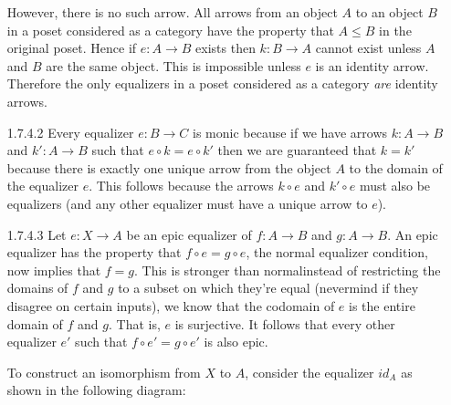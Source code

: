 \documentclass{article}
\begin{document}
\begin{enumerate}
\begin{center}
  \end{center}

  However, there is no such arrow.
  All arrows from an object $A$ to an object $B$ in a poset considered as a category have the property that $A \le B$ in the original poset.
  Hence if $e : A \rightarrow B$ exists then $k : B \rightarrow A$ cannot exist unless $A$ and $B$ are the same object.
  This is impossible unless $e$ is an identity arrow.
  Therefore the only equalizers in a poset considered as a category \emph{are} identity arrows.

\item[]
\item[1.7.4.2]
  Every equalizer $e : B \rightarrow C$ is monic because if we have arrows $k : A \rightarrow B$ and $k' : A \rightarrow B$ such that $e \circ k = e \circ k'$ then we are guaranteed that $k = k'$ because there is exactly one unique arrow from the object $A$ to the domain of the equalizer $e$.
  This follows because the arrows $k \circ e$ and $k' \circ e$ must also be equalizers (and any other equalizer must have a unique arrow to $e$).
  
\item[]
\item[1.7.4.3]
  Let $e : X \rightarrow A$ be an epic equalizer of $f : A \rightarrow B$ and $g : A \rightarrow B$.
  An epic equalizer has the property that $f \circ e = g \circ e$, the normal equalizer condition, now implies that $f = g$.
  This is stronger than normal\textemdash instead of restricting the domains of $f$ and $g$ to a subset on which they're equal (nevermind if they disagree on certain inputs), we know that the codomain of $e$ is the entire domain of $f$ and $g$.
  That is, $e$ is surjective.
  It follows that every other equalizer $e'$ such that $f \circ e' = g \circ e'$ is also epic.
  
  To construct an isomorphism from $X$ to $A$, consider the equalizer $id_A$ as shown in the following diagram:
  \begin{center}
\end{center}
\end{enumerate}
\end{document}
